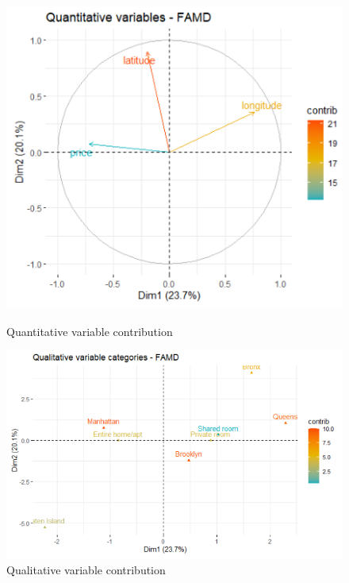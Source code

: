 \documentclass{FR16}
\begin{document}
\begin{figure}[!htb]
   \begin{minipage}{0.48\textwidth}
     \centering
    \includegraphics[width=1\textwidth]{figures/FAMD3.PNG} 
 \caption{\label{fig:33} Quantitative variable contribution}
   \end{minipage}\hfill
   \begin{minipage}{0.48\textwidth}
     \centering
       \includegraphics[width=1\textwidth]{figures/FAMD4.PNG} 
 \caption{\label{fig:34} Qualitative variable contribution }
   \end{minipage}
   
\end{figure}
\end{document}
